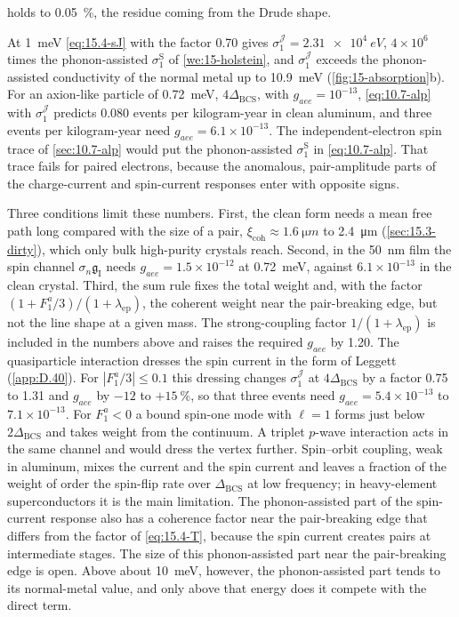 holds to \SI{0.05}{\percent}, the residue coming from the Drude shape.

At \SI{1}{meV} \cref{eq:15.4-sJ} with the factor 0.70 gives $\sigma_1^{\mathcal{J}} = \SI{2.31e4}{eV}$, $4\times10^6$ times the phonon-assisted $\sigma_1^{\mathrm{S}}$ of \cref{we:15-holstein}, and $\sigma_1^{\mathcal{J}}$ exceeds the phonon-assisted conductivity of the normal metal up to \SI{10.9}{meV} (\cref{fig:15-absorption}b). For an axion-like particle of \SI{0.72}{meV}, $4\Delta_{\mathrm{BCS}}$, with $g_{aee} = 10^{-13}$, \cref{eq:10.7-alp} with $\sigma_1^{\mathcal{J}}$ predicts 0.080 events per kilogram-year in clean aluminum, and three events per kilogram-year need $g_{aee} = 6.1\times10^{-13}$. The independent-electron spin trace of \cref{sec:10.7-alp} would put the phonon-assisted $\sigma_1^{\mathrm{S}}$ in \cref{eq:10.7-alp}. That trace fails for paired electrons, because the anomalous, pair-amplitude parts of the charge-current and spin-current responses enter with opposite signs.

Three conditions limit these numbers. First, the clean form needs a mean free path long compared with the size of a pair, $\xi_{\mathrm{coh}} \approx \SI{1.6}{\micro m}$ to \SI{2.4}{\micro m} (\cref{sec:15.3-dirty}), which only bulk high-purity crystals reach. Second, in the \SI{50}{nm} film the spin channel $\sigma_n\mathfrak{g}_{\mathrm{I}}$ needs $g_{aee} = 1.5\times10^{-12}$ at \SI{0.72}{meV}, against $6.1\times10^{-13}$ in the clean crystal. Third, the sum rule fixes the total weight and, with the factor $(1 + F_1^a/3)/(1 + \lambda_{\mathrm{ep}})$, the coherent weight near the pair-breaking edge, but not the line shape at a given mass. The strong-coupling factor $1/(1 + \lambda_{\mathrm{ep}})$ is included in the numbers above and raises the required $g_{aee}$ by 1.20. The quasiparticle interaction dresses the spin current in the form of Leggett (\cref{app:D.40}). For $|F_1^a/3| \le 0.1$ this dressing changes $\sigma_1^{\mathcal{J}}$ at $4\Delta_{\mathrm{BCS}}$ by a factor 0.75 to 1.31 and $g_{aee}$ by $-12$ to $+\SI{15}{\percent}$, so that three events need $g_{aee} = 5.4\times10^{-13}$ to $7.1\times10^{-13}$. For $F_1^a < 0$ a bound spin-one mode with $\ell = 1$ forms just below $2\Delta_{\mathrm{BCS}}$ and takes weight from the continuum. A triplet $p$-wave interaction acts in the same channel and would dress the vertex further. Spin--orbit coupling, weak in aluminum, mixes the current and the spin current and leaves a fraction of the weight of order the spin-flip rate over $\Delta_{\mathrm{BCS}}$ at low frequency; in heavy-element superconductors it is the main limitation. The phonon-assisted part of the spin-current response also has a coherence factor near the pair-breaking edge that differs from the factor of \cref{eq:15.4-T}, because the spin current creates pairs at intermediate stages. The size of this phonon-assisted part near the pair-breaking edge is open. Above about \SI{10}{meV}, however, the phonon-assisted part tends to its normal-metal value, and only above that energy does it compete with the direct term.

